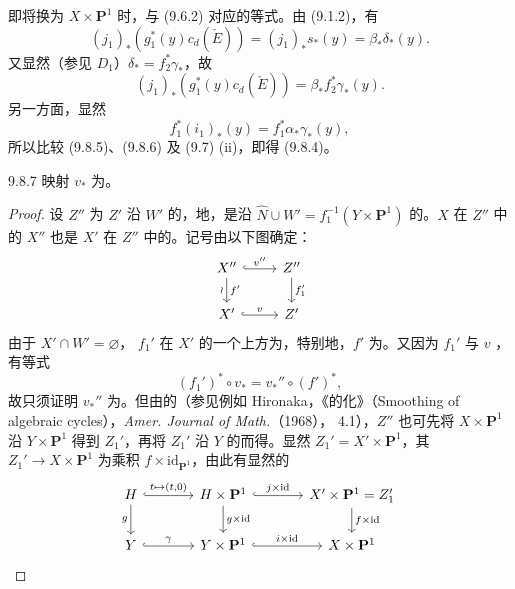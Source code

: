 即将换为 $X\times\mathbf P^1$ 时，与 (9.6.2) 对应的等式。由 (9.1.2)，有
\[
 (j_1)_*(g_1^*(y)c_d(\check E))=(j_1)_*s_*(y)=\beta_*\delta_*(y).
\]
又显然（参见 $D_1$）$\delta_*=f_2^*\gamma_*$，故
\[
 (j_1)_*(g_1^*(y)c_d(\check E))=\beta_*f_2^*\gamma_*(y).\tag{9.8.5}
\]
另一方面，显然
\[
 f_1^*(i_1)_*(y)=f_1^*\alpha_*\gamma_*(y),\tag{9.8.6}
\]
所以比较 (9.8.5)、(9.8.6) 及 (9.7) (ii)，即得 (9.8.4)。
\begin{SGAresult}{}{9.8.7}
映射 $v_*$ 为。
\end{SGAresult}
\begin{proof}
设 $Z''$ 为 $Z'$ 沿 $W'$ 的，地，是沿 $\widehat N\cup W'=f_1^{-1}(Y\times\mathbf P^1)$ 的。$X$ 在 $Z''$ 中的 $X''$ 也是 $X'$ 在 $Z''$ 中的。记号由以下图确定：
\[
\begin{tikzcd}
X''\arrow[r,hook,"v''"]\arrow[d,"f'","\wr"']&Z''\arrow[d,"f_1'"]\\
X'\arrow[r,hook,"v"]&Z'
\end{tikzcd}
\]
由于 $X'\cap W'=\varnothing$， $f_1'$ 在 $X'$ 的一个上方为，特别地，$f'$ 为。又因为 $f_1'$ 与 $v$ ，有等式
\[
 (f_1')^*\circ v_*=v_*''\circ(f')^*,\tag{9.8.8}
\]
故只须证明 $v_*''$ 为。但由的（参见例如 Hironaka，《的化》（Smoothing of algebraic cycles），\emph{Amer. Journal of Math.}（1968）， 4.1），$Z''$ 也可先将 $X\times\mathbf P^1$ 沿 $Y\times\mathbf P^1$ 得到 $Z_1'$，再将 $Z_1'$ 沿 $Y$ 的而得。显然 $Z_1'=X'\times\mathbf P^1$，其 $Z_1'\to X\times\mathbf P^1$ 为乘积 $f\times\mathrm{id}_{\mathbf P^1}$，由此有显然的
\[
\begin{tikzcd}[column sep=large]
H\arrow[r,hook,"{t\mapsto(t,0)}"]\arrow[d,"g"']&H\times\mathbf P^1\arrow[r,hook,"j\times\mathrm{id}"]\arrow[d,"g\times\mathrm{id}"]&X'\times\mathbf P^1=Z_1'\arrow[d,"f\times\mathrm{id}"]\\
Y\arrow[r,hook,"\gamma"]&Y\times\mathbf P^1\arrow[r,hook,"i\times\mathrm{id}"]&X\times\mathbf P^1

\end{tikzcd}\]
\end{proof}
